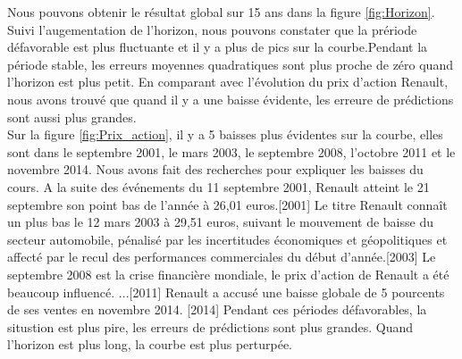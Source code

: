 Nous pouvons obtenir le résultat global sur 15 ans dans la figure \ref{fig:Horizon}. Suivi l'augementation de l'horizon, nous pouvons constater que la prériode défavorable est plus fluctuante et il y a plus de pics sur la courbe.Pendant la période stable, les erreurs moyennes quadratiques sont plus proche de zéro quand l'horizon est plus petit. En comparant avec l'évolution du prix d'action Renault, nous avons trouvé que quand il y a une baisse évidente, les erreure de prédictions sont aussi plus grandes. \\

Sur la figure \ref{fig:Prix_action}, il y a 5 baisses plus évidentes sur la courbe, elles sont dans le septembre 2001, le mars 2003, le septembre 2008, l'octobre 2011 et le novembre 2014. Nous avons fait des recherches pour expliquer les baisses du cours. A la suite des événements du 11 septembre 2001, Renault atteint le 21 septembre son point bas de l'année à 26,01 euros.[2001] Le titre Renault connaît un plus bas le 12 mars 2003 à 29,51 euros, suivant le mouvement de baisse du secteur automobile, pénalisé par les incertitudes économiques et géopolitiques et affecté par le recul des performances commerciales du début d’année.[2003] Le septembre 2008 est la crise financière mondiale, le prix d'action de Renault a été beaucoup influencé. ...[2011] Renault a accusé une baisse globale de 5 pourcents de ses ventes en novembre 2014. [2014] Pendant ces périodes défavorables, la situstion est plus pire, les erreurs de prédictions sont plus grandes. Quand l'horizon est plus long, la courbe est plus perturpée. \\ 


